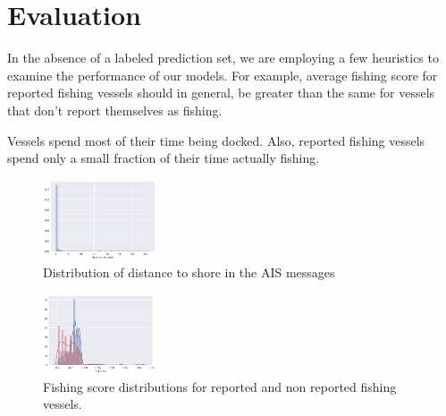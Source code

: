 \section{Evaluation}

In the absence of a labeled prediction set, we are employing a few heuristics to examine the performance of our models.
For example, average fishing score for reported fishing vessels should in general, be greater than the same for vessels that don't report themselves as fishing.

	
Vessels spend most of their time being docked. Also, reported fishing vessels spend only a small fraction of their time actually fishing.

\begin{figure}[H]
\centering
\includegraphics[width=0.3\textwidth]{images/distance_to_shore.png}
\caption{\label{fig:Distance to shore distribution}Distribution of distance to shore in the AIS messages}
\end{figure}


\begin{figure}[H]
\centering
\includegraphics[width=0.3\textwidth]{images/fishing_score_distributions.png}
\caption{\label{fig:Fishing score distribution}Fishing score distributions for reported and non reported fishing vessels.}
\end{figure}

